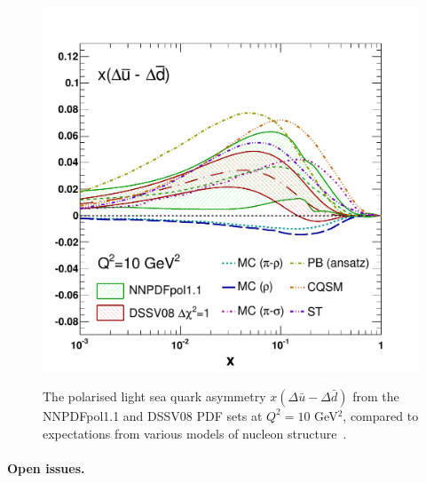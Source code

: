 \begin{figure}[!h]
\centering
\includegraphics[scale=0.35]{plots/asysea_2}\\
\caption{The polarised light sea quark asymmetry 
$x(\Delta\bar{u}-\Delta\bar{d})$ from the NNPDFpol1.1 and 
DSSV08 PDF sets at $Q^2=10$ GeV$^2$, compared to expectations from 
various models of nucleon structure~\cite{Chang:2014jba}.}
\label{fig:RHICpdfs1}
\end{figure}
\paragraph{Open issues.}

